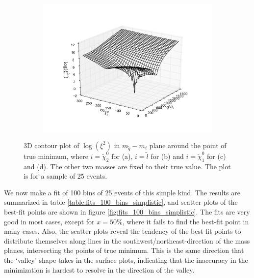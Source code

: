 \documentclass[twoside,english]{uiofysmaster}
\begin{document}
\begin{figure}[hbt]
	\begin{subfigure}[b]{0.49\textwidth}
		\includegraphics[width=\textwidth]{figures/3D_plot_xisquared_25_simplistic_events_squark-chi1.pdf} 
		\caption{}
	\end{subfigure}
	\caption{3D contour plot of $\log(\xi^2)$ in $m_{\tilde q}-m_i$ plane around the point of true minimum, where $i=\tilde \chi_2^0$ for (a), $i=\tilde l$ for (b) and $i=\tilde \chi_1^0$ for (c) and (d). The other two masses are fixed to their true value. The plot is for a sample of 25 events.}
	\label{fig:3D_masses_simplistic}
\end{figure}

We now make a fit of 100 bins of 25 events of this simple kind. The results are summarized in table \ref{table:fits_100_bins_simplistic}, and scatter plots of the best-fit points are shown in figure \ref{fig:fits_100_bins_simplistic}. The fits are very good in most cases, except for $x = 50 \%$, where it fails to find the best-fit point in many cases. Also, the scatter plots reveal the tendency of the best-fit points to distribute themselves along lines in the southwest/northeast-direction of the mass planes, intersecting the points of true minimum. This is the same direction that the `valley' shape takes in the surface plots, indicating that the inaccuracy in the minimization is hardest to resolve in the direction of the valley.
\end{document}
